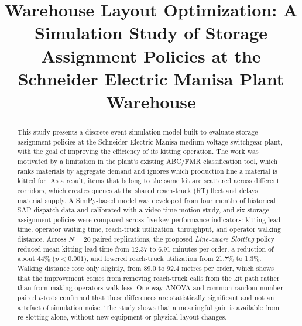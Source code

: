 \documentclass[conference]{IEEEtran}
\newcommand{\policy}[1]{\textit{#1}}
\begin{document}
\title{Warehouse Layout Optimization: A Simulation Study of Storage
Assignment Policies at the Schneider Electric Manisa Plant Warehouse}

\author{
}

\maketitle

\begin{abstract}
This study presents a discrete-event simulation model built to evaluate
storage-assignment policies at the Schneider Electric Manisa medium-voltage
switchgear plant, with the goal of improving the efficiency of its kitting
operation. The work was motivated by a limitation in the plant's existing
ABC/FMR classification tool, which ranks materials by aggregate demand and
ignores which production line a material is kitted for. As a result, items
that belong to the same kit are scattered across different corridors, which
creates queues at the shared reach-truck (RT) fleet and delays material
supply. A SimPy-based model was developed from four months of historical SAP
dispatch data and calibrated with a video time-motion study, and six
storage-assignment policies were compared across five key performance
indicators: kitting lead time, operator waiting time, reach-truck
utilization, throughput, and operator walking distance. Across $N=20$ paired
replications, the proposed \policy{Line-aware Slotting} policy reduced mean
kitting lead time from 12.37 to 6.91 minutes per order, a reduction of about
44\% ($p<0.001$), and lowered reach-truck utilization from 21.7\% to 1.3\%.
Walking distance rose only slightly, from 89.0 to 92.4 metres per order,
which shows that the improvement comes from removing reach-truck calls from
the kit path rather than from making operators walk less. One-way ANOVA and
common-random-number paired $t$-tests confirmed that these differences are
statistically significant and not an artefact of simulation noise. The study
shows that a meaningful gain is available from re-slotting alone, without new
equipment or physical layout changes.

\end{abstract}
\end{document}
